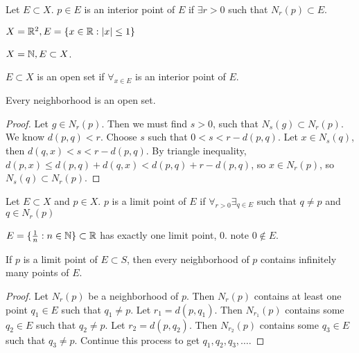 \begin{definition}
	Let $E \subset X$. $p \in E$ is an interior point of $E$ if $\exists r>0$ such that $N_r(p) \subset E$.
\end{definition}
\begin{example}
	\item $X=\mathbb{R}^2, E=\{x \in \mathbb{R} : |x|\le 1\} $
	\item $X=\mathbb{N}, E \subset X$.
\end{example}

\begin{definition}
	$E \subset X$ is an open set if $\forall_{x\in E}$ is an interior point of $E$.

\end{definition}

\begin{thm}[19]
	Every neighborhood is an open set.
	\begin{proof}
		Let $g \in N_r(p)$. Then we must find $s>0$, such that $N_s(g) \subset N_r(p)$.
		We know $d(p,q)<r$. Choose $s$ such that $0<s<r-d(p,q)$.
		Let $x \in N_s(q)$, then $d(q,x) < s<r-d(p,q)$.
		By triangle inequality, $d(p,x) \le d(p,q)+d(q,x)<d(p,q)+r-d(p,q)$, so $x \in N_r(p)$, so $N_s(q) \subset N_r(p)$.
	\end{proof}
\end{thm}

\begin{definition}
	Let $E \subset X$ and $p \in X$.
	$p$ is a limit point of $E$ if $\forall_{r>0} \exists_{q \in E}$ such that $q \neq p$ and $q \in N_r(p)$
\end{definition}
\begin{example}
	$E=\{\frac{1}{n}: n \in  \mathbb{N} \}\subset \mathbb{R}  $ has exactly one limit point, $0$. note $0 \not\in E$.
\end{example}

\begin{thm}[20]
	If $p$ is a limit point of $E \subset S$, then every neighborhood of $p$ contains infinitely many points of $E$.
	\begin{proof}
		Let $N_r(p)$ be a neighborhood of $p$. Then $N_r(p)$ contains at least one point $q_1 \in E$ such that $q_1 \neq p$.
		Let $r_1=d(p,q_1)$. Then $N_{r_1}(p)$ contains some $q_2 \in E$ such that $q_2 \neq p$.
		Let $r_2=d(p,q_2)$. Then $N_{r_2}(p)$ contains some $q_3 \in E$ such that $q_3 \neq p$.
		Continue this process to get $q_1,q_2,q_3,\ldots$.
	\end{proof}

\end{thm}

